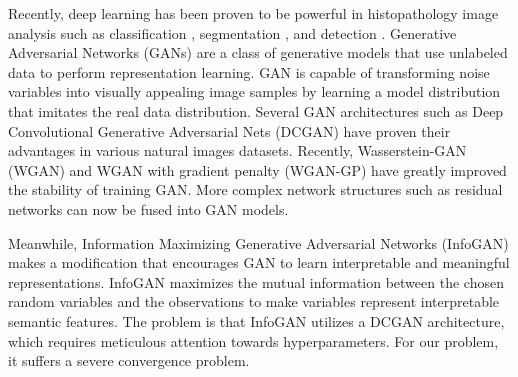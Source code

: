 \documentclass[journal]{IEEEtran}
\begin{document}
Recently, deep learning has been proven to be powerful in histopathology image analysis such as classification \cite{Xu2014Deep,xu2015deep}, segmentation \cite{xu2016deep,Chen2016DCAN}, and detection \cite{chen2014deep,cirecsan2013mitosis}. Generative Adversarial Networks (GANs) \cite{goodfellow2014generative} are a class of generative models that use unlabeled data to perform representation learning. GAN is capable of transforming noise variables into visually appealing image samples by learning a model distribution that imitates the real data distribution. Several GAN architectures such as Deep Convolutional Generative Adversarial Nets (DCGAN) \cite{radford2015unsupervised} have proven their advantages in various natural images datasets. Recently, Wasserstein-GAN (WGAN) \cite{arjovsky2017wasserstein} and WGAN with gradient penalty (WGAN-GP) \cite{gulrajani2017improved} have greatly improved the stability of training GAN. More complex network structures such as residual networks \cite{he2016deep} can now be fused into GAN models.

Meanwhile, Information Maximizing Generative Adversarial Networks (InfoGAN) \cite{chen2016infoGAN} makes a modification that encourages GAN to learn interpretable and meaningful representations. InfoGAN maximizes the mutual information between the chosen random variables and the observations to make variables represent interpretable semantic features. The problem is that InfoGAN utilizes a DCGAN architecture, which requires meticulous attention towards hyperparameters. For our problem, it suffers a severe convergence problem.


\end{document}
